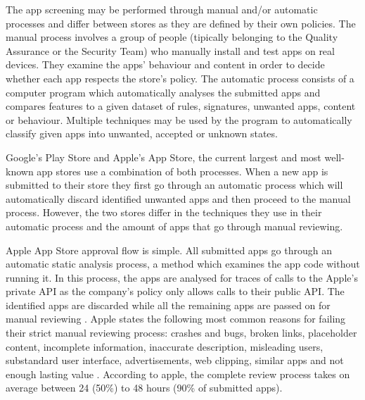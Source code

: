 The app screening may be performed through manual and/or automatic processes and differ between stores as they are defined by their own policies. The manual process involves a group of people (tipically belonging to the Quality Assurance or the Security Team) who manually install and test apps on real devices. They examine the apps' behaviour and content in order to decide whether each app respects the store's policy. The automatic process consists of a computer program which automatically analyses the submitted apps and compares features to a given dataset of rules, signatures, unwanted apps, content or behaviour. Multiple techniques may be used by the program to automatically classify given apps into unwanted, accepted or unknown states\cite{Bhattacharya2017}.

Google's Play Store and Apple's App Store, the current largest and most well-known app stores use a combination of both processes. When a new app is submitted to their store they first go through an automatic process which will automatically discard identified unwanted apps and then proceed to the manual process. However, the two stores differ in the techniques they use in their automatic process and the amount of apps that go through manual reviewing\cite{AppleInsiderWebsite}\cite{AndroidWhitePaper}.

Apple App Store approval flow is simple. All submitted apps go through an automatic static analysis process, a method which examines the app code without running it. In this process, the apps are analysed for traces of calls to the Apple's private API as the company's policy only allows calls to their public API. The identified apps are discarded while all the remaining apps are passed on for manual reviewing \cite{AppleInsiderWebsite}\cite{AppleApprovalFortune}. Apple states the following most common reasons for failing their strict manual reviewing process: crashes and bugs, broken links, placeholder content, incomplete information, inaccurate description, misleading users, substandard user interface, advertisements, web clipping, similar apps and not enough lasting value \cite{AppleReviewRejections}. According to apple, the complete review process takes on average between 24 (50\%) to 48 hours (90\% of submitted apps)\cite{AppleReviewTime}. 

